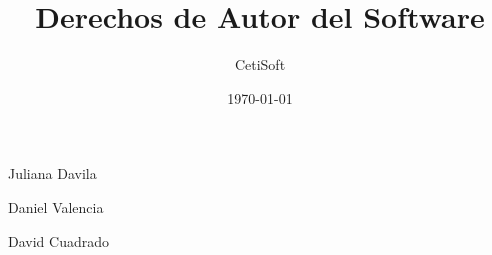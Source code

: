 \documentclass{beamer}
\title{Derechos de Autor del Software}
\author{CetiSoft}
\date{\today}
\begin{document}
\frame
{
	\titlepage
	\begin{center}
	\item Juliana Davila
	\item Daniel Valencia
	\item David Cuadrado
	\end{center}
}

\section[Contenidos]{}
\frame{\tableofcontents}












\end{document}
